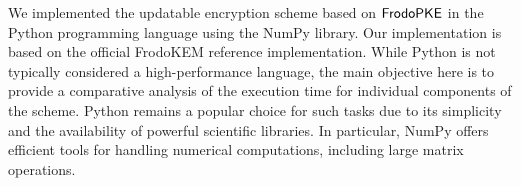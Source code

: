 \documentclass{fundam}
\begin{document}
\begin{table}[ht]
\end{table}

We implemented the updatable encryption scheme based on $\mathsf{FrodoPKE}$ in the Python programming language using the NumPy library. Our implementation is based on the official FrodoKEM reference implementation. While Python is not typically considered a high-performance language, the main objective here is to provide a comparative analysis of the execution time for individual components of the scheme. Python remains a popular choice for such tasks due to its simplicity and the availability of powerful scientific libraries. In particular, NumPy offers efficient tools for handling numerical computations, including large matrix operations.
\end{document}
